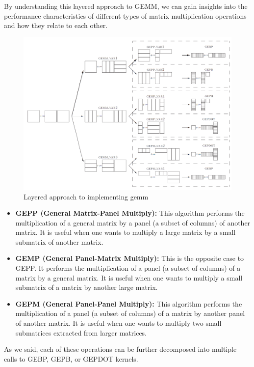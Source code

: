 By understanding this layered approach to GEMM, we can gain insights into the performance characteristics of different types of matrix multiplication operations and how they relate to each other.

\begin{figure}[H]
\centering
\includegraphics[width=130mm]{Figures/Imagenes/Special_cases_GEMM.png}
\caption{Layered approach to implementing gemm}
\end{figure}

\begin{itemize}
\item \textbf{GEPP (General Matrix-Panel Multiply):} This algorithm performs the multiplication of a general matrix by a panel (a subset of columns) of another matrix. It is useful when one wants to multiply a large matrix by a small submatrix of another matrix.

\item \textbf{GEMP (General Panel-Matrix Multiply):} This is the opposite case to GEPP. It performs the multiplication of a panel (a subset of columns) of a matrix by a general matrix. It is useful when one wants to multiply a small submatrix of a matrix by another large matrix.

\item \textbf{GEPM (General Panel-Panel Multiply):} This algorithm performs the multiplication of a panel (a subset of columns) of a matrix by another panel of another matrix. It is useful when one wants to multiply two small submatrices extracted from larger matrices.
\end{itemize}

As we said, each of these operations can be further decomposed into multiple calls to GEBP, GEPB, or GEPDOT kernels.

